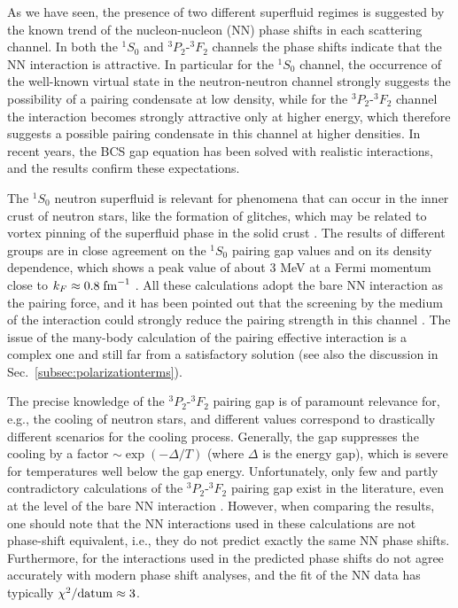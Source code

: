 \documentclass[rmp,aps,floatfix]{revtex4}
\begin{document}
As we have seen, the  
presence of two different superfluid regimes 
is suggested by the known trend of the 
nucleon-nucleon (NN) phase shifts 
in each scattering channel. 
In both the $^1S_0$ and $^3P_2$-$^3F_2$ channels the
phase shifts indicate that the NN interaction is attractive. 
In particular for the $^1S_0$ channel, the occurrence of 
the well-known virtual state in the neutron-neutron channel
strongly suggests the possibility of a 
pairing condensate at low density, 
while for the $^3P_2$-$^3F_2$ channel the 
interaction becomes strongly attractive only
at higher energy, which therefore suggests a possible 
pairing condensate
in this channel at higher densities. 
In recent years, the BCS gap equation
has been solved with realistic interactions, 
and the results confirm
these expectations. 

The $^1S_0$ neutron superfluid is relevant for phenomena
that can occur in the inner crust of neutron stars, like the 
formation of glitches, which may be related to vortex pinning  
of the superfluid phase in the solid crust \cite{glitch}. 
The results of different groups are in close agreement
on the $^1S_0$ pairing gap values and on 
its density dependence, which
shows a peak value of about 3 MeV at a Fermi momentum close to
$k_F \approx 0.8\; {\rm fm}^{-1}$ \cite{bcll90,kkc96,eh98,sclbl96}. 
All these calculations adopt the bare
NN interaction as the pairing force, and it has been pointed out
that the screening by the medium of the interaction 
could strongly reduce
the pairing strength in this channel \cite{sclbl96,chen86,ains89a,ains89b}. 
The issue of the 
many-body calculation of the pairing 
effective interaction is a complex
one and still far from a satisfactory solution (see
also the discussion in Sec.~\ref{subsec:polarizationterms}).


The precise knowledge of the $^3P_2$-$^3F_2$ pairing gap is of 
paramount relevance for, e.g., the cooling of neutron stars, 
and different values correspond to drastically
different scenarios for the cooling process.
Generally, the gap suppresses the cooling by a factor
$\sim\exp(-\Delta/T)$ (where $\Delta$ is the energy gap),
which is severe for
temperatures well below the gap energy.
Unfortunately, only few and partly
contradictory calculations of the $^3P_2$-$^3F_2$ 
pairing gap exist in the literature, 
even at the level of the bare NN interaction 
\cite{amu85,bcll92,taka93,elga96,kkc96}. 
However, when comparing the results, one should note that the  
NN interactions used in these calculations are not phase-shift 
equivalent, i.e.,  they do not 
predict exactly the same NN phase shifts.  
Furthermore, for the interactions used in 
\cite{amu85,bcll92,taka93,elga96} the predicted 
phase shifts do not agree accurately with modern phase shift 
analyses, and the fit of the NN data has typically 
$\chi^2/{\rm datum}\approx 3$.  
\end{document}
